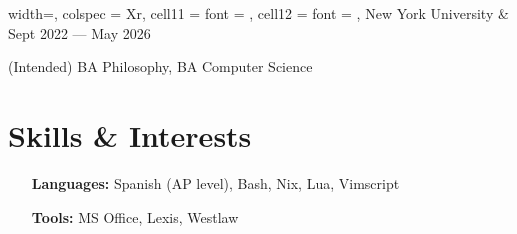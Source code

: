 \documentclass{article}
\begin{document}
\vspace{0.5em}

\begin{tblr}{
    width=\textwidth,
    colspec = {Xr},
    cell{1}{1} = {font = {\bfseries}},
    cell{1}{2} = {font = {\itshape}},
  }
  New York University & Sept 2022 --- May 2026 \\
\end{tblr}
\begin{compactitem}
  \item
    (Intended) BA Philosophy, BA Computer Science
\end{compactitem}

\vspace{0.5em}

\section{Skills \& Interests}
\titlerule

\vspace{0.5em}

\begin{itemize}
  \item[\bfseries Languages:]
    Spanish (AP level), Bash, Nix, Lua, Vimscript

  \item[\bfseries Tools:]
    MS Office, Lexis, Westlaw
\end{itemize}
\end{document}
